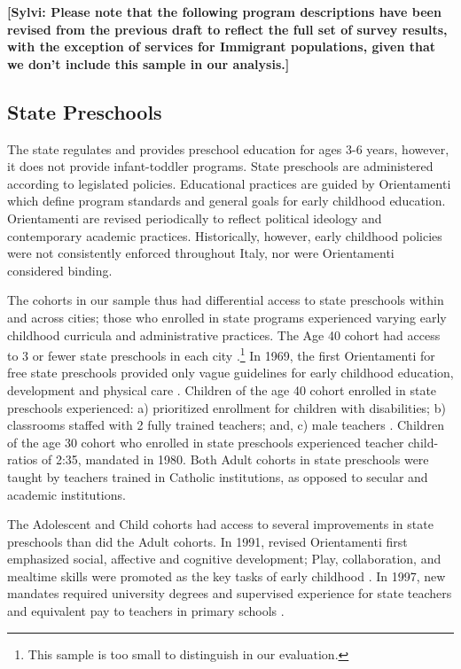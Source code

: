 
\textbf{[Sylvi: Please note that the following program descriptions have been revised from the previous draft to reflect the full set of survey results, with the exception of services for Immigrant populations, given that we don't include this sample in our analysis.]} 

\subsection{State Preschools}

The state regulates and provides preschool education for ages 3-6 years, however, it does not provide infant-toddler programs. State preschools are administered according to legislated policies. Educational practices are guided by Orientamenti which define program standards and general goals for early childhood education. Orientamenti are revised periodically to reflect political ideology and contemporary academic practices. Historically, however, early childhood policies were not consistently enforced throughout Italy, nor were Orientamenti considered binding. 

The cohorts in our sample thus had differential access to state preschools within and across cities; those who enrolled in state programs experienced varying early childhood curricula and administrative practices. The Age 40 cohort had access to 3 or fewer state preschools in each city \citep{Reggio-Admin-data_1966-2006,Reggio-Annual-Journals_1994-2011,Padova-Admin-Data_1964-2011}.\footnote{This sample is too small to distinguish in our evaluation.} In 1969, the first Orientamenti for free state preschools provided only vague guidelines for early childhood education, development and physical care \citep{Corsaro_1996_Early-Edu,Hohnerlein_2015_Development-and-Diffusion}. Children of the age 40 cohort enrolled in state preschools experienced: a) prioritized enrollment for children with disabilities; b) classrooms staffed with 2 fully trained teachers; and, c) male teachers \citep{Hohnerlein_2015_Development-and-Diffusion}. Children of the age 30 cohort who enrolled in state preschools experienced teacher child-ratios of 2:35, mandated in 1980. Both Adult cohorts in state preschools were taught by teachers trained in Catholic institutions, as opposed to secular and academic institutions.

The Adolescent and Child cohorts had access to several improvements in state preschools than did the Adult cohorts. In 1991, revised Orientamenti first emphasized social, affective and cognitive development; Play, collaboration, and mealtime skills were promoted as the key tasks of early childhood \citep{Corsaro_1996_Early-Edu}. In 1997, new mandates required university degrees and supervised experience for state teachers and equivalent pay to teachers in primary schools \citep{Ghedini_2001_Ital-Natl-Policy}. 

